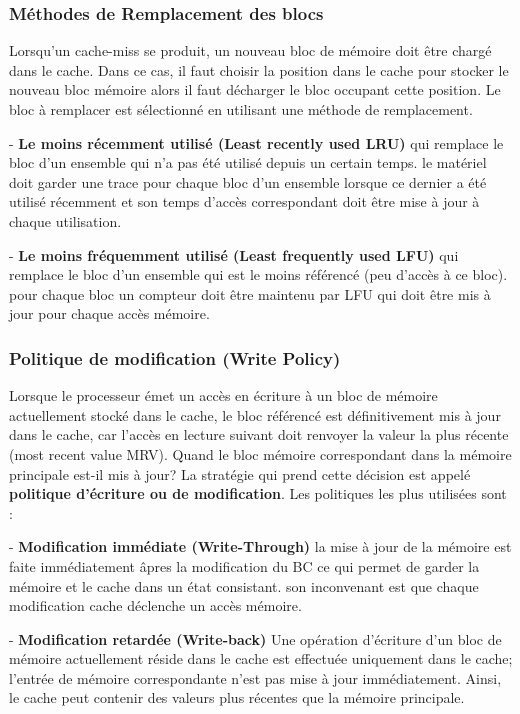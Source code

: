\subsubsection{Méthodes de Remplacement des blocs}
%
Lorsqu'un cache-miss se produit, un nouveau bloc de mémoire doit être chargé dans le cache. Dans ce cas, il faut choisir la position dans le cache pour stocker le nouveau bloc mémoire alors il faut décharger le bloc occupant cette position.
Le bloc à remplacer est sélectionné en utilisant une méthode de remplacement.

- \textbf {Le moins récemment utilisé (Least recently used LRU)} qui remplace le bloc d'un ensemble qui n'a pas été utilisé depuis un certain temps.
le matériel doit garder une trace pour chaque bloc d'un ensemble lorsque ce dernier a été utilisé récemment et son temps d'accès correspondant doit être mise à jour à chaque utilisation.

- \textbf{Le moins fréquemment utilisé (Least frequently used LFU)} qui remplace le bloc d'un ensemble qui est le moins référencé (peu d'accès à ce bloc).
pour chaque bloc un compteur doit être maintenu par LFU qui doit être mis à jour pour chaque accès mémoire.
%
\subsubsection{Politique de modification (Write Policy)}
%
Lorsque le processeur émet un accès en écriture à un bloc de mémoire actuellement stocké dans le cache, le bloc référencé est définitivement mis à jour dans le cache, car l'accès en lecture suivant doit renvoyer la valeur la plus récente (most recent value MRV).
Quand le bloc mémoire correspondant dans la mémoire principale est-il mis à jour? La stratégie qui prend cette décision est appelé \textbf{politique d'écriture ou de modification}. Les politiques les plus utilisées sont :

- \textbf{Modification immédiate (Write-Through)}
la mise à jour de la mémoire est faite immédiatement âpres la modification du BC ce qui permet de garder la mémoire et le cache dans un état consistant. 
son inconvenant est que chaque modification cache déclenche un accès mémoire.

- \textbf {Modification retardée (Write-back)}
Une opération d'écriture d'un bloc de mémoire actuellement réside dans le cache est effectuée uniquement dans le cache; l'entrée de mémoire correspondante n'est pas mise à jour immédiatement. Ainsi, le cache peut contenir des valeurs plus récentes que la mémoire principale.
%
